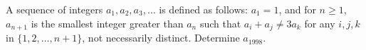 A sequence of integers $a_1, a_2, a_3, \ldots$ is defined as follows: $a_1 = 1$, and for $n \geq 1$, $a_{n+1}$ is the smallest integer greater than $a_n$ such that $a_i + a_j \neq 3a_k$ for any $i, j, k$ in $\{1, 2, \ldots, n+1\}$, not necessarily distinct. Determine $a_{1998}$.

